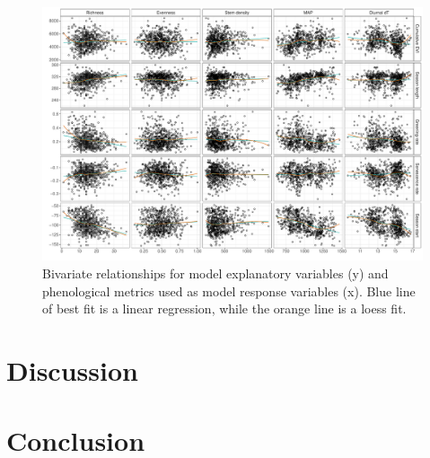 \documentclass[11pt,a4paper]{article}
\begin{document}
\begin{landscape}
\begin{figure}
\centering
	\includegraphics[width=1.4\textwidth]{bivar}
	\caption{Bivariate relationships for model explanatory variables (y) and phenological metrics used as model response variables (x). Blue line of best fit is a linear regression, while the orange line is a loess fit.}
	\label{bivar}
\end{figure}
\end{landscape}

\section{Discussion}

\section{Conclusion}


\end{document}

